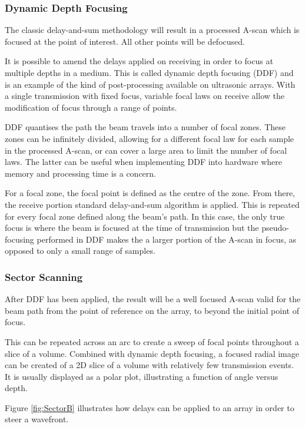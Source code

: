\subsubsection{Dynamic Depth Focusing}

The classic delay-and-sum methodology will result in a processed A-scan which is focused at the point of interest. All other points will be defocused. 

It is possible to amend the delays applied on receiving in order to focus at multiple depths in a medium\cite{chatillon_simulation_2009}. This is called dynamic depth focusing (DDF) and is an example of the kind of post-processing available on ultrasonic arrays. With a single transmission with fixed focus, variable focal laws on receive allow the modification of focus through a range of points.

DDF quantises the path the beam travels into a number of focal zones. These zones can be infinitely divided, allowing for a different focal law for each sample in the processed A-scan, or can cover a large area to limit the number of focal laws. The latter can be useful when implementing DDF into hardware where memory and processing time is a concern.

For a focal zone, the focal point is defined as the centre of the zone. From there, the receive portion standard delay-and-sum algorithm is applied. This is repeated for every focal zone defined along the beam's path. In this case, the only true focus is where the beam is focused at the time of transmission but the pseudo-focusing performed in DDF makes the a larger portion of the A-scan in focus, as opposed to only a small range of samples.

\subsubsection{Sector Scanning}

After DDF has been applied, the result will be a well focused A-scan valid for the beam path from the point of reference on the array, to beyond the initial point of focus.

This can be repeated across an arc to create a sweep of focal points throughout a slice of a volume. Combined with dynamic depth focusing, a focused radial image can be created of a 2D slice of a volume with relatively few transmission events. It is usually displayed as a polar plot, illustrating a function of angle versus depth.

Figure \ref{fig:SectorB} illustrates how delays can be applied to an array in order to steer a wavefront.

